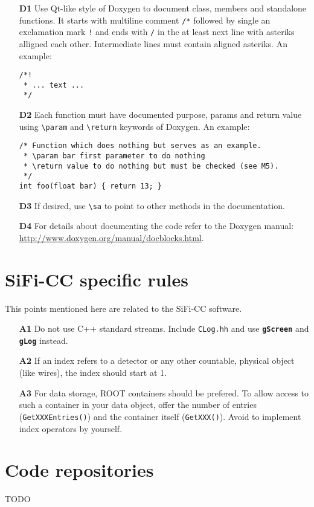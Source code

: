 \documentclass[a4paper,10pt]{article}
\newcommand{\sificc}{SiFi-CC\xspace}
\begin{document}
\begin{itemize}
  \item[\bf D1] Use Qt-like style of Doxygen to document class, members and
    standalone functions. It starts with multiline comment {\tt /*} followed by
    single an exclamation mark {\tt !} and ends with {\tt */} in the at least
    next line with asteriks {\tt *} alligned each other. Intermediate lines must
    contain aligned asteriks. An example:
    \begin{verbatim}
/*!
 * ... text ...
 */
    \end{verbatim}
  \item[\bf D2] Each function must have documented purpose, params and return
    value using {\tt \textbackslash{}param} and {\tt \textbackslash{}return}
    keywords of Doxygen. An example:
    \begin{verbatim}
/* Function which does nothing but serves as an example.
 * \param bar first parameter to do nothing
 * \return value to do nothing but must be checked (see M5).
 */
int foo(float bar) { return 13; }
    \end{verbatim}
  \item[\bf D3] If desired, use {\tt \textbackslash{}sa} to point to other
    methods in the documentation.
  \item[\bf D4] For details about documenting the code refer to the Doxygen
    manual: \url{http://www.doxygen.org/manual/docblocks.html}.
\end{itemize}


\section{\sificc specific rules}

This points mentioned here are related to the \sificc software.

\begin{itemize}
\item[\bf A1] Do not use C++ standard streams. Include {\tt CLog.hh} and use
  {\tt\bf gScreen} and {\bf\tt gLog} instead.
\item[\bf A2] If an index refers to a detector or any other countable, physical
  object (like wires), the index should start at 1.
\item[\bf A3] For data storage, ROOT containers should be prefered. To allow
 access to such a container in your data object, offer the number
 of entries ({\tt GetXXXEntries()}) and the container itself
({\tt GetXXX()}). Avoid to implement index operators by yourself.
\end{itemize}

\section{Code repositories}\label{sec:repos}

TODO
\end{document}
